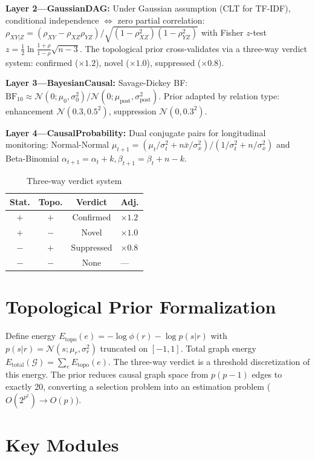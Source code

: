 \documentclass[10pt,twocolumn]{article}
\begin{document}
\textbf{Layer 2---GaussianDAG:} Under Gaussian assumption (CLT for TF-IDF), conditional independence $\Leftrightarrow$ zero partial correlation: $\rho_{XY|Z}=(\rho_{XY}-\rho_{XZ}\rho_{YZ})/\sqrt{(1-\rho_{XZ}^2)(1-\rho_{YZ}^2)}$ with Fisher $z$-test $z=\frac12\ln\frac{1+\rho}{1-\rho}\sqrt{n-3}$. The topological prior cross-validates via a three-way verdict system: confirmed ($\times1.2$), novel ($\times1.0$), suppressed ($\times0.8$).

\textbf{Layer 3---BayesianCausal:} Savage-Dickey BF: $\text{BF}_{10}\approx\mathcal{N}(0;\mu_0,\sigma_0^2)/\mathcal{N}(0;\mu_{\text{post}},\sigma^2_{\text{post}})$. Prior adapted by relation type: enhancement $\mathcal{N}(0.3,0.5^2)$, suppression $\mathcal{N}(0,0.3^2)$.

\textbf{Layer 4---CausalProbability:} Dual conjugate pairs for longitudinal monitoring: Normal-Normal $\mu_{t+1}=(\mu_t/\sigma_t^2+n\bar{x}/\sigma_x^2)/(1/\sigma_t^2+n/\sigma_x^2)$ and Beta-Binomial $\alpha_{t+1}=\alpha_t+k,\beta_{t+1}=\beta_t+n-k$.

\begin{table}[H]
\centering\small\caption{Three-way verdict system}
\begin{tabular}{cccl}
\toprule
Stat. & Topo. & Verdict & Adj. \\
\midrule
$+$ & $+$ & Confirmed & $\times1.2$ \\
$+$ & $-$ & Novel     & $\times1.0$ \\
$-$ & $+$ & Suppressed & $\times0.8$ \\
$-$ & $-$ & None      & --- \\
\bottomrule
\end{tabular}
\end{table}

\section{Topological Prior Formalization}

Define energy $E_{\text{topo}}(e)=-\log\phi(r)-\log p(s|r)$ with $p(s|r)=\mathcal{N}(s;\mu_r,\sigma_r^2)$ truncated on $[-1,1]$. Total graph energy $E_{\text{total}}(\mathcal{G})=\sum_e E_{\text{topo}}(e)$. The three-way verdict is a threshold discretization of this energy. The prior reduces causal graph space from $p(p-1)$ edges to exactly 20, converting a selection problem into an estimation problem ($O(2^{p^2})\to O(p)$).

\section{Key Modules}
\end{document}
